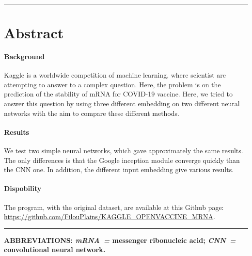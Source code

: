 \documentclass[12pt, oneside, a4paper]{report}
\begin{document}
\begin{center}
    \begin{minipage}{16cm}
        \hrule height 0.5pt width 16cm
        
        \vspace{2ex}
        
        \section*{Abstract}
        \paragraph*{Background}
        Kaggle is a worldwide competition of machine learning, where scientist are attempting to answer to a complex question. Here, the problem is on the prediction of the stability of mRNA for COVID-19 vaccine. Here, we tried to answer this question by using three different embedding on two different neural networks with the aim to compare these different methods.

        \vspace{2ex}
        
        \paragraph*{Results}
        We test two simple neural networks, which gave approximately the same results. The only differences is that the Google inception module converge quickly than the CNN one. In addition, the different input embedding give various results.
        
        \vspace{2ex}
        
        \paragraph*{Dispobility}
        The program, with the original dataset, are available at this Github page: \url{https://github.com/FilouPlains/KAGGLE_OPENVACCINE_MRNA}. 

        \vspace{2ex}
        
        \hrule height 0.5pt width 16cm
        
        \vspace{2ex}
        
        \begin{footnotesize}
            \bfseries ABBREVIATIONS: \textit{mRNA~=} messenger ribonucleic acid; \textit{CNN~=} convolutional neural network.
        \end{footnotesize}
    \end{minipage}
\end{center}
\end{document}
